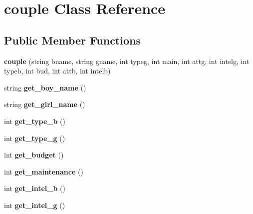 \hypertarget{classcouple}{}\section{couple Class Reference}
\label{classcouple}
\subsection*{Public Member Functions}
\begin{DoxyCompactItemize}
\item 
{\bfseries couple} (string bname, string gname, int typeg, int main, int attg, int intelg, int typeb, int bud, int attb, int intelb)\hypertarget{classcouple_abc37ce13d780cfb65a8c9faa32f78a18}{}\label{classcouple_abc37ce13d780cfb65a8c9faa32f78a18}

\item 
string {\bfseries get\+\_\+boy\+\_\+name} ()\hypertarget{classcouple_a7509063c85166d9379f89fa91ca233e3}{}\label{classcouple_a7509063c85166d9379f89fa91ca233e3}

\item 
string {\bfseries get\+\_\+girl\+\_\+name} ()\hypertarget{classcouple_af9744648e0e28ad082532f5793de59fe}{}\label{classcouple_af9744648e0e28ad082532f5793de59fe}

\item 
int {\bfseries get\+\_\+type\+\_\+b} ()\hypertarget{classcouple_aa33dbb38af1025824dd94cb8891e4ac5}{}\label{classcouple_aa33dbb38af1025824dd94cb8891e4ac5}

\item 
int {\bfseries get\+\_\+type\+\_\+g} ()\hypertarget{classcouple_adc5bcaa41bafb9662b3570bca6cfe33a}{}\label{classcouple_adc5bcaa41bafb9662b3570bca6cfe33a}

\item 
int {\bfseries get\+\_\+budget} ()\hypertarget{classcouple_aa4cdbbef8308e177abd6a1012868b003}{}\label{classcouple_aa4cdbbef8308e177abd6a1012868b003}

\item 
int {\bfseries get\+\_\+maintenance} ()\hypertarget{classcouple_ad005e0c9f0cb5df4a43e7ef0a6741034}{}\label{classcouple_ad005e0c9f0cb5df4a43e7ef0a6741034}

\item 
int {\bfseries get\+\_\+intel\+\_\+b} ()\hypertarget{classcouple_a80a09d3fe39d9bf34c27fc20d708cf26}{}\label{classcouple_a80a09d3fe39d9bf34c27fc20d708cf26}

\item 
int {\bfseries get\+\_\+intel\+\_\+g} ()\hypertarget{classcouple_a87297f6c26c39c8a4b54de1a839e9af1}{}\label{classcouple_a87297f6c26c39c8a4b54de1a839e9af1}


\end{DoxyCompactItemize}
